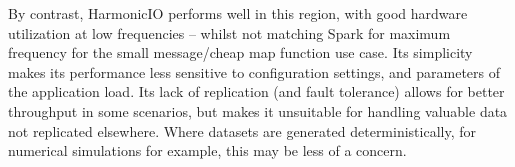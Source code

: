 \documentclass[letterpaper,conference]{IEEEtran}
\begin{document}
By contrast, HarmonicIO performs well in this region, with good hardware utilization at low frequencies -- whilst not matching Spark for maximum frequency for the small message/cheap map function use case. Its simplicity makes its performance less sensitive to configuration settings, and parameters of the application load. Its lack of replication (and fault tolerance) allows for better throughput in some scenarios, but makes it unsuitable for handling valuable data not replicated elsewhere. Where datasets are generated deterministically, for numerical simulations for example, this may be less of a concern.
\end{document}
